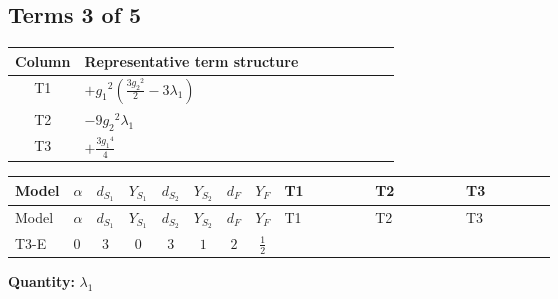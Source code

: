 \documentclass[8pt]{article}
\begin{document}
\begin{landscape}
\subsection*{Terms 3 of 5}
\begin{center}
\begin{tabular}{@{}c >{\raggedright\arraybackslash}p{0.82\linewidth}@{}}
\toprule
Column & Representative term structure \\
\midrule
T1 & \(\displaystyle +{g_1}^2 \left(\frac{3 {g_2}^2}{2}-3 {\lambda_1}\right)\) \\
\midrule
T2 & \(\displaystyle -9 {g_2}^2 {\lambda_1}\) \\
\midrule
T3 & \(\displaystyle +\frac{3 {g_1}^4}{4}\) \\
\midrule
\bottomrule
\end{tabular}
\end{center}
\smallskip
\tiny
\begin{longtable}{@{}llcccccc >{\raggedright\arraybackslash}p{0.21\linewidth} >{\raggedright\arraybackslash}p{0.21\linewidth} >{\raggedright\arraybackslash}p{0.21\linewidth}@{}}
\toprule
Model & $\alpha$ & $d_{S_1}$ & $Y_{S_1}$ & $d_{S_2}$ & $Y_{S_2}$ & $d_F$ & $Y_F$ & T1 & T2 & T3 \\
\midrule
\endfirsthead
\toprule
Model & $\alpha$ & $d_{S_1}$ & $Y_{S_1}$ & $d_{S_2}$ & $Y_{S_2}$ & $d_F$ & $Y_F$ & T1 & T2 & T3 \\
\midrule
\endhead
T3-E & $0$ & $3$ & $0$ & $3$ & $1$ & $2$ & $\frac{1}{2}$ & \scriptsize\adjustbox{max width=\linewidth}{$\begin{gathered} +{g_1}^2 \left(\frac{3 {g_2}^2}{2}-3 {\lambda_1}\right)\end{gathered}$} & \scriptsize\adjustbox{max width=\linewidth}{$\begin{gathered} -9 {g_2}^2 {\lambda_1}\end{gathered}$} & \scriptsize\adjustbox{max width=\linewidth}{$\begin{gathered} +\frac{3 {g_1}^4}{4}\end{gathered}$} \\
\midrule
\bottomrule
\end{longtable}
\clearpage
\noindent\textbf{Quantity: }$\lambda_1$\par\smallskip

\end{landscape}
\end{document}
